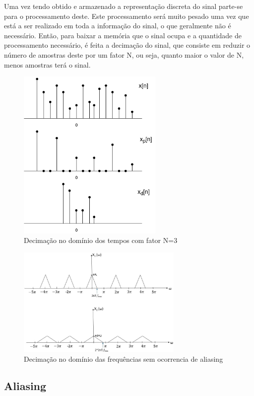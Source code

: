 \documentclass[11pt]{article}
\begin{document}
Uma vez tendo obtido e armazenado a representação discreta do sinal parte-se para o processamento deste. Este processamento será muito pesado uma vez que está a ser realizado em toda a informação do sinal, o que geralmente não é necessário. Então, para baixar a memória que o sinal ocupa e a quantidade de processamento necessário, é feita a decimação do sinal, que consiste em reduzir o número de amostras deste por um fator N, ou seja, quanto maior o valor de N, menos amostras terá o sinal.
\begin{figure}[!h]
\begin{center}
\includegraphics[width=7cm]{decimacao1.PNG}
\caption{Decimação no domínio dos tempos com fator N=3}
\label{figura3}
\end{center}
\end{figure}
\begin{figure}[!h]
\begin{center}
\includegraphics[width=8cm]{decimacao2.jpg}
\caption{Decimação no domínio das frequências sem ocorrencia de aliasing}
\label{figura4}
\end{center}
\end{figure}
\subsection{Aliasing}
\end{document}
